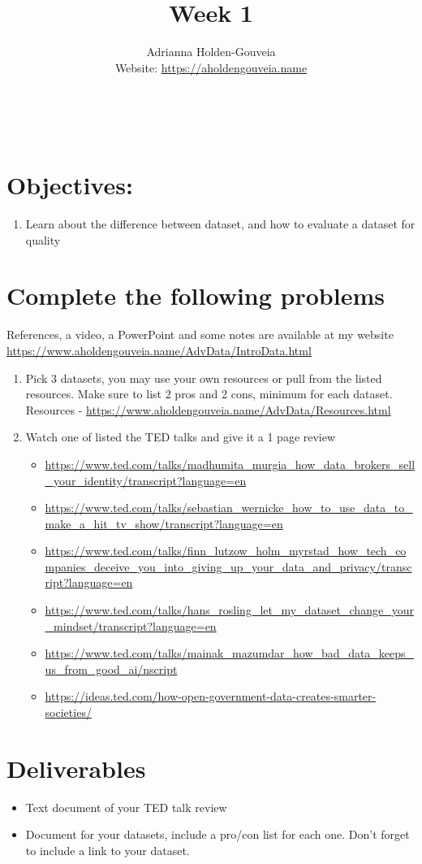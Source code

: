 \documentclass[12pt]{article}
\title{Week 1}
\author{
        Adrianna Holden-Gouveia \\
        Website: \url{https://aholdengouveia.name}\\ 
        \date{\vspace{-5ex}}
        \faLinkedin{: aholdengouveia} \\
        \faGithub {: aholdengouveia} \\
        }
\begin{document}
    

\maketitle


\section*{Objectives:}
\begin{enumerate}
    \item Learn about the difference between dataset, and how to evaluate a dataset for quality
\end{enumerate}
\section*{Complete the following problems}

References, a video, a PowerPoint and some notes are available at my website
\url {https://www.aholdengouveia.name/AdvData/IntroData.html}


    \begin{enumerate}
        \item Pick 3 datasets, you may use your own resources or pull from the listed resources.  Make sure to list 2 pros and 2 cons, minimum for each dataset.  Resources - \url{https://www.aholdengouveia.name/AdvData/Resources.html}
        \item Watch one of listed the TED talks and give it a 1 page review
            \begin{itemize}
                \item  \url{https://www.ted.com/talks/madhumita_murgia_how_data_brokers_sell_your_identity/transcript?language=en}
                \item \url{https://www.ted.com/talks/sebastian_wernicke_how_to_use_data_to_make_a_hit_tv_show/transcript?language=en}
                \item \url{https://www.ted.com/talks/finn_lutzow_holm_myrstad_how_tech_companies_deceive_you_into_giving_up_your_data_and_privacy/transcript?language=en}
                \item \url{https://www.ted.com/talks/hans_rosling_let_my_dataset_change_your_mindset/transcript?language=en} 
                \item \url{https://www.ted.com/talks/mainak_mazumdar_how_bad_data_keeps_us_from_good_ai/nscript} 
                \item \url{https://ideas.ted.com/how-open-government-data-creates-smarter-societies/}
            \end{itemize}
    \end{enumerate}



\section*{Deliverables}
\begin{itemize}
    \item Text document of your TED talk review
    \item Document for your datasets, include a pro/con list for each one.  Don't forget to include a link to your dataset.
\end{itemize}
\end{document}
